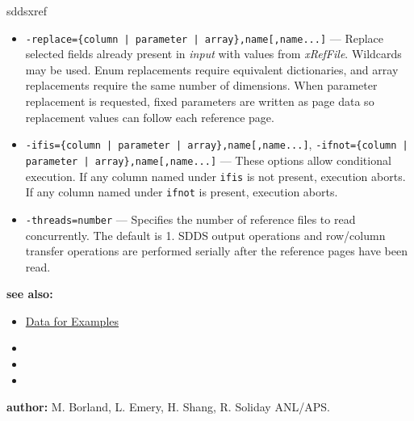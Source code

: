 \begin{sddsprog}{sddsxref}
\begin{itemize}
        multiple times, specifies the names of parameters and arrays to be transferred. Wildcards may
        be used in the names.
      \item \verb!-replace={column | parameter | array},name[,name...]! --- Replace selected fields
        already present in \emph{input} with values from \emph{xRefFile}. Wildcards may be used.
        Enum replacements require equivalent dictionaries, and array replacements require the same
        number of dimensions. When parameter replacement is requested, fixed parameters are written
        as page data so replacement values can follow each reference page.
      \item \verb!-ifis={column | parameter | array},name[,name...]!, \verb!-ifnot={column | parameter | array},name[,name...]! --- These options allow conditional execution. If any
        column named under \verb|ifis| is not present, execution aborts. If any column named under
        \verb|ifnot| is present, execution aborts.
      \item \verb|-threads=number| --- Specifies the number of reference files to read concurrently.
        The default is 1. SDDS output operations and row/column transfer operations are performed
        serially after the reference pages have been read.
    \end{itemize}
  \item \textbf{see also:}
    \begin{itemize}
      \item \hyperref[exampleData]{Data for Examples}
      \item {}
      \item {}
      \item {}
    \end{itemize}
  \item \textbf{author:} M. Borland, L. Emery, H. Shang, R. Soliday ANL/APS.
\end{sddsprog}
